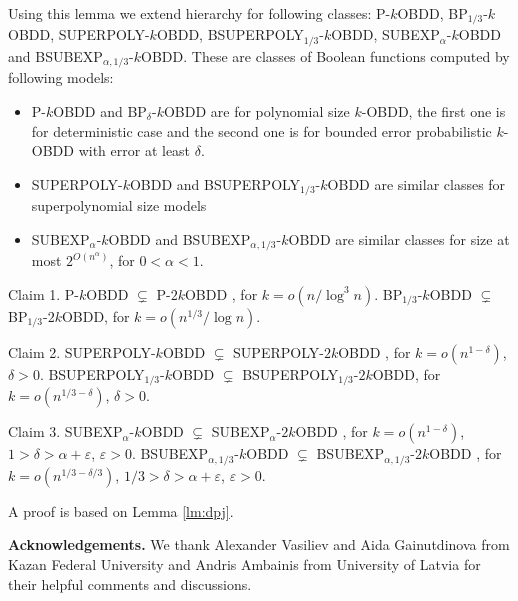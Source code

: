 \documentclass{llncs}
\begin{document}
Using this lemma we extend  hierarchy for following classes: P-$k$OBDD,  BP$_{1/3}$-$k$OBDD, SUPERPOLY-$k$OBDD,  BSUPERPOLY$_{1/3}$-$k$OBDD, SUBEXP$_{\alpha}$-$k$OBDD and BSUBEXP$_{\alpha,1/3}$-$k$OBDD. These are classes of Boolean functions computed by following models: 
\begin{itemize}
\item P-$k$OBDD and  BP$_{\delta}$-$k$OBDD are for polynomial size $k$-OBDD, the first one is for deterministic case and the second one is for bounded error probabilistic $k$-OBDD with error at least $\delta$.
\item SUPERPOLY-$k$OBDD and  BSUPERPOLY$_{1/3}$-$k$OBDD are similar classes for superpolynomial size models
\item SUBEXP$_{\alpha}$-$k$OBDD and BSUBEXP$_{\alpha,1/3}$-$k$OBDD are similar classes for size at most $2^{O(n^\alpha)}$, for $0<\alpha<1$.
\end{itemize}
\begin{theorem}\label{thm:hierarchy}
Claim 1.
P-$k$OBDD $\subsetneq$ P-$2k$OBDD , for $k = o(n/\log^3 n)$. BP$_{1/3}$-$k$OBDD $\subsetneq$ BP$_{1/3}$-$2k$OBDD, for $k = o(n^{1/3}/\log n)$.

Claim 2.
SUPERPOLY-$k$OBDD $\subsetneq$ SUPERPOLY-$2k$OBDD , for $k = o(n^{1-\delta})$, $\delta>0$. BSUPERPOLY$_{1/3}$-$k$OBDD $\subsetneq$ BSUPERPOLY$_{1/3}$-$2k$OBDD, for $k = o(n^{1/3-\delta})$, $\delta>0$.

Claim 3.
SUBEXP$_{\alpha}$-$k$OBDD $\subsetneq$ SUBEXP$_{\alpha}$-$2k$OBDD , for $k = o(n^{1-\delta})$,  $1>\delta>\alpha+\varepsilon$, $\varepsilon>0$. BSUBEXP$_{\alpha,1/3}$-$k$OBDD $\subsetneq$ BSUBEXP$_{\alpha,1/3}$-$2k$OBDD , for $k = o(n^{1/3-\delta/3})$, $1/3>\delta>\alpha+\varepsilon$, $\varepsilon>0$.
\end{theorem}
A proof is based on Lemma \ref{lm:dpj}. 

\noindent
\textbf{Acknowledgements.}
We thank Alexander Vasiliev and Aida Gainutdinova from Kazan Federal University and Andris Ambainis from University of Latvia for their helpful comments and discussions. 




\end{document}
